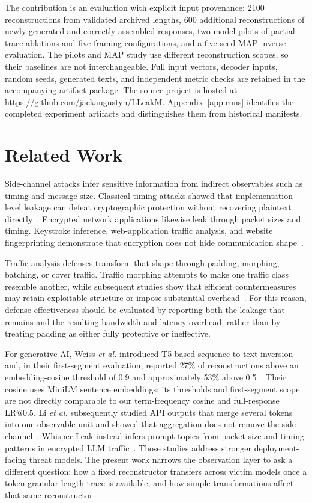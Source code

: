\documentclass[electronics,article,submit,pdftex,moreauthors]{Definitions/mdpi}
\begin{document}
The contribution is an evaluation with explicit input provenance: 2100 reconstructions from validated archived lengths, 600 additional reconstructions of newly generated and correctly assembled responses, two-model pilots of partial trace ablations and five framing configurations, and a five-seed MAP-inverse evaluation. The pilots and MAP study use different reconstruction scopes, so their baselines are not interchangeable. Full input vectors, decoder inputs, random seeds, generated texts, and independent metric checks are retained in the accompanying artifact package. The source project is hosted at \url{https://github.com/jackaugustyn/LLeakM}. Appendix~\ref{app:runs} identifies the completed experiment artifacts and distinguishes them from historical manifests.

\section{Related Work}
Side-channel attacks infer sensitive information from indirect observables such as timing and message size. Classical timing attacks showed that implementation-level leakage can defeat cryptographic protection without recovering plaintext directly~\cite{kocher1996timing}. Encrypted network applications likewise leak through packet sizes and timing. Keystroke inference, web-application traffic analysis, and website fingerprinting demonstrate that encryption does not hide communication shape~\cite{song2001timing,chen2010sidechannel,cai2012touching,sirinam2018deep}.

Traffic-analysis defenses transform that shape through padding, morphing, batching, or cover traffic. Traffic morphing attempts to make one traffic class resemble another, while subsequent studies show that efficient countermeasures may retain exploitable structure or impose substantial overhead~\cite{wright2009morphing,dyer2012peekaboo}. For this reason, defense effectiveness should be evaluated by reporting both the leakage that remains and the resulting bandwidth and latency overhead, rather than by treating padding as either fully protective or ineffective.

For generative AI, Weiss \emph{et al.} introduced T5-based sequence-to-text inversion and, in their first-segment evaluation, reported 27\% of reconstructions above an embedding-cosine threshold of 0.9 and approximately 53\% above 0.5~\cite{weiss2024prompt}. Their cosine uses MiniLM sentence embeddings; its thresholds and first-segment scope are not directly comparable to our term-frequency cosine and full-response $\mathrm{LR}@0.5$. Li \emph{et al.} subsequently studied API outputs that merge several tokens into one observable unit and showed that aggregation does not remove the side channel~\cite{li2026length}. Whisper Leak instead infers prompt topics from packet-size and timing patterns in encrypted LLM traffic~\cite{whisperleak2025}. Those studies address stronger deployment-facing threat models. The present work narrows the observation layer to ask a different question: how a fixed reconstructor transfers across victim models once a token-granular length trace is available, and how simple transformations affect that same reconstructor.
\end{document}
